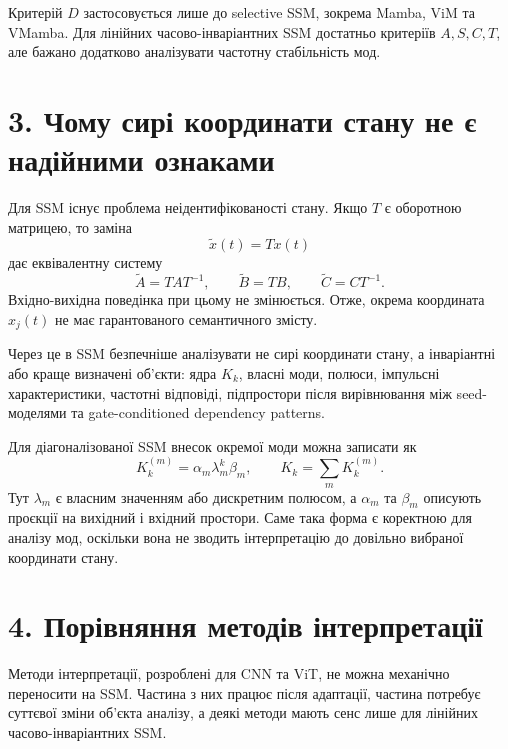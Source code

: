 \documentclass[12pt,a4paper]{article}
\begin{document}
Критерій \(D\) застосовується лише до selective SSM, зокрема Mamba,
ViM та VMamba. Для лінійних часово-інваріантних SSM достатньо критеріїв
\(A,S,C,T\), але бажано додатково аналізувати частотну стабільність
мод.

\section*{3. Чому сирі координати стану не є надійними ознаками}

Для SSM існує проблема неідентифікованості стану. Якщо \(T\) є
оборотною матрицею, то заміна
\[
    \tilde{x}(t)=Tx(t)
\]
дає еквівалентну систему
\[
    \tilde{A}=TAT^{-1}, \qquad
    \tilde{B}=TB, \qquad
    \tilde{C}=CT^{-1}.
\]
Вхідно-вихідна поведінка при цьому не змінюється. Отже, окрема
координата \(x_j(t)\) не має гарантованого семантичного змісту.

Через це в SSM безпечніше аналізувати не сирі координати стану, а
інваріантні або краще визначені об'єкти: ядра \(K_k\), власні моди,
полюси, імпульсні характеристики, частотні відповіді, підпростори
після вирівнювання між seed-моделями та gate-conditioned dependency
patterns.

Для діагоналізованої SSM внесок окремої моди можна записати як
\[
    K_k^{(m)} = \alpha_m \lambda_m^k \beta_m,
    \qquad
    K_k = \sum_m K_k^{(m)}.
\]
Тут \(\lambda_m\) є власним значенням або дискретним полюсом,
а \(\alpha_m\) та \(\beta_m\) описують проєкції на вихідний і вхідний
простори. Саме така форма є коректною для аналізу мод, оскільки вона
не зводить інтерпретацію до довільно вибраної координати стану.

\section*{4. Порівняння методів інтерпретації}

Методи інтерпретації, розроблені для CNN та ViT, не можна механічно
переносити на SSM. Частина з них працює після адаптації, частина
потребує суттєвої зміни об'єкта аналізу, а деякі методи мають сенс
лише для лінійних часово-інваріантних SSM.
\end{document}
